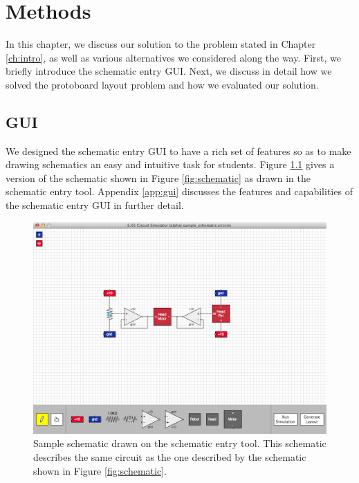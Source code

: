 
\chapter{Methods}
\label{ch:methods}

In this chapter, we discuss our solution to the problem stated in Chapter
\ref{ch:intro}, as well as various alternatives we considered along the way.
First, we briefly introduce the schematic entry GUI.
Next, we discuss in detail how we solved the protoboard layout problem and how
we evaluated our solution.

\section{GUI}

We designed the schematic entry GUI to have a rich set of features so as to make
drawing schematics an easy and intuitive task for students.
Figure \ref{fig:gui_example} gives a version of the schematic shown in Figure
\ref{fig:schematic} as drawn in the schematic entry tool. Appendix \ref{app:gui}
discusses the features and capabilities of the schematic entry GUI in
further detail.

\begin{figure}
\begin{center}
\includegraphics[width=\textwidth]{Images/gui_example.png}
\caption[Schematic entry example]{Sample schematic drawn on the schematic entry
tool. This schematic describes the same circuit as the one described by the
schematic shown in Figure \ref{fig:schematic}.}
\label{fig:gui_example}
\end{center}
\end{figure}


